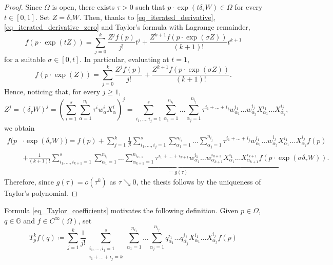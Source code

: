 \documentclass[11pt]{amsart}
\theoremstyle{plain}
\theoremstyle{definition}
\theoremstyle{remark}
\numberwithin{equation}{section}
\begin{document}
\begin{proof}
Since $\Omega$ is open, there exists $\tau>0$ such that $p \cdot \exp(t\delta_\tau W) \in \Omega$ for every $t \in [0,1]$. Set $Z=\delta_\tau W$. Then, thanks to \eqref{eq_iterated_derivative}, \eqref{eq_iterated_derivative_zero} and Taylor's formula with Lagrange remainder,
\begin{equation*}
f(p \cdot \exp(tZ))=\sum_{j=0}^k \frac{Z^j f(p)}{j!} t^j + \frac{Z^{k+1}f(p \cdot \exp(\sigma Z))}{(k+1)!}t^{k+1}
\end{equation*}
for a suitable $\sigma \in [0,t]$. In particular, evaluating at $t=1$,
\begin{equation*}
f(p \cdot \exp(Z))=\sum_{j=0}^k \frac{Z^j f(p)}{j!} + \frac{Z^{k+1}f(p \cdot \exp(\sigma Z))}{(k+1)!}.
\end{equation*}
Hence, noticing that, for every $j \geq 1$,
\begin{equation*}
Z^j=(\delta_\tau W)^j=\left(\sum_{i=1}^s \sum_{\alpha=1}^{n_i} \tau^i w^i_\alpha X^i_\alpha\right)^j=\sum_{i_1,\dots,i_j=1}^s \sum_{\alpha_1=1}^{n_{i_1}} \dots \sum_{\alpha_j=1}^{n_{i_j}} \tau^{i_1+\dots+i_j} w^{i_1}_{\alpha_1} \dots w^{i_j}_{\alpha_j} X^{i_1}_{\alpha_1} \dots X^{i_j}_{\alpha_j},
\end{equation*}
we obtain
\begin{equation*}
\begin{split}
    f(p & \cdot \exp(\delta_\tau W)) = f(p) + \sum_{j=1}^k \frac{1}{j!} \sum_{i_1,\dots,i_j=1}^s \sum_{\alpha_1=1}^{n_{i_1}} \dots \sum_{\alpha_j=1}^{n_{i_j}} \tau^{i_1+\dots+i_j} w^{i_1}_{\alpha_1} \dots w^{i_j}_{\alpha_j} X^{i_1}_{\alpha_1} \dots X^{i_j}_{\alpha_j}f(p) \\ & + \underbrace{\frac{1}{(k+1)!} \sum_{i_1,\dots,i_{k+1}=1}^s \sum_{\alpha_1=1}^{n_{i_1}} \dots \sum_{\alpha_{k+1}=1}^{n_{i_{k+1}}} \tau^{i_1+\dots+i_{k+1}} w^{i_1}_{\alpha_1} \dots w^{i_{k+1}}_{\alpha_{k+1}} X^{i_1}_{\alpha_1} \dots X^{i_{k+1}}_{\alpha_{k+1}}f(p \cdot \exp(\sigma \delta_\tau W))}_{\eqqcolon g(\tau)}.
\end{split}
\end{equation*}
Therefore, since $g(\tau)=o\left(\tau^k\right)$ as $\tau \searrow 0$, the thesis follows by the uniqueness of Taylor's polynomial.
\end{proof}
Formula \eqref{eq_Taylor_coefficients} motivates the following definition. Given $p \in \Omega$, $q \in \mathbb{G}$ and $f \in C^\infty(\Omega)$, set
\begin{equation} \label{eq_higher_order_derivatives}
T^k_p f(q) \coloneqq \sum_{j=1}^k \frac{1}{j!} \sum_{\substack{i_1,\dots,i_j=1 \\ i_1+\dots+i_j=k}}^s \sum_{\alpha_1=1}^{n_{i_1}} \dots \sum_{\alpha_j=1}^{n_{i_j}} q^{i_1}_{\alpha_1} \dots q^{i_j}_{\alpha_j} X^{i_1}_{\alpha_1} \dots X^{i_j}_{\alpha_j}f(p)
\end{equation}
\end{document}
